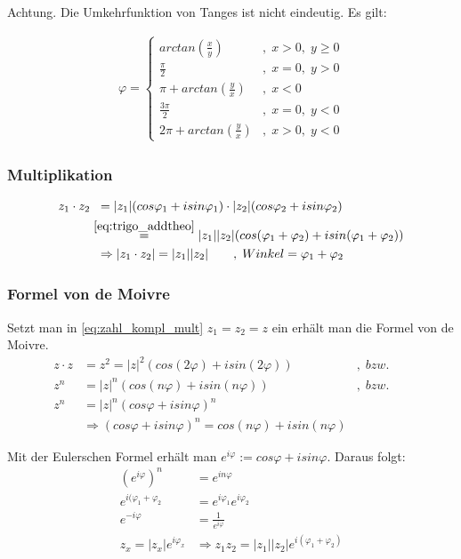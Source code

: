 \documentclass[12pt,a4paper]{article}%
\numberwithin{equation}{section}
\numberwithin{equation}{subsection}
\begin{document}
		Achtung. Die Umkehrfunktion von Tanges ist nicht eindeutig. Es gilt:
		
		\begin{align}
		\varphi = 
		\begin{cases} 
		    arctan(\frac{x}{y}) \qquad &,\; x > 0,\; y\geq 0\\
		    \frac{\pi}{2}  &,\;x = 0,\; y > 0\\
		    \pi + arctan(\frac{y}{x}) &,\; x < 0\\
		    \frac{3\pi}{2} &,\; x=0,\;y< 0\\
		    2\pi + arctan(\frac{y}{x}) &,\; x> 0,\; y < 0
		\end{cases}
		\end{align}
	
	  \subsubsection{Multiplikation}
	  \begin{align}
	  z_1 \cdot z_2 &\;\; = |z_1|(cos\varphi_1 + isin\varphi_1) \cdot |z_2| (cos\varphi_2 + isin\varphi_2)\\
	  &\overset{\eqref{eq:trigo_addtheo}}{=} |z_1| |z_2| (cos(\varphi_1 + \varphi_2) + isin(\varphi_1 + \varphi_2))\\
	  &\;\; \Rightarrow |z_1 \cdot z_2| = |z_1| |z_2| \qquad ,\; Winkel = \varphi_1 + \varphi_2 \label{eq:zahl_kompl_mult}
	  \end{align}
	  
	  \subsubsection{Formel von de Moivre}
	  Setzt man in \eqref{eq:zahl_kompl_mult} $z_1 = z_2 = z$ ein erhält man die Formel von de Moivre.
	  \begin{align}
	    z \cdot z &= z^2 = |z|^2 (cos(2\varphi) + isin(2\varphi)) &,\; bzw.&&\nonumber\\
	    z^n &= |z|^n(cos(n\varphi)  + isin(n \varphi)) &,\; bzw.&&\nonumber\\
	    z^n& = |z|^n(cos\varphi + isin\varphi)^n\nonumber\\
	    &\Rightarrow (cos\varphi + isin\varphi)^n = cos(n\varphi) + isin(n\varphi)
	  \end{align}
	
	  Mit der Eulerschen Formel erhält man $e^{i\varphi} := cos\varphi + isin\varphi$. Daraus folgt:
	  \begin{align}
	  (e^{i\varphi})^n &= e^{in\varphi} \\
	  e^{i(\varphi_1 + \varphi_2} &= e^{i\varphi_1} e^{i\varphi_2}\\
	  e^{-i\varphi} &= \frac{1}{e^{i\varphi}}\\
	  z_x = |z_x|e^{i\varphi_x} &\Rightarrow z_1 z_2 = |z_1| |z_2| e^{i(\varphi_1 + \varphi_2)}
	  \end{align}
\end{document}
